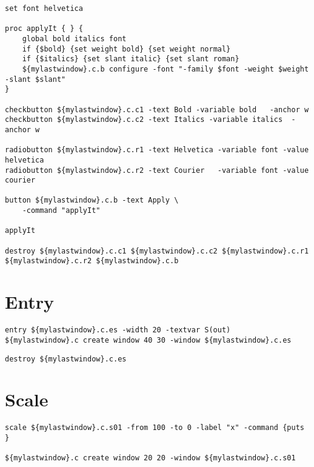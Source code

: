 \begin{lstlisting}
set font helvetica

proc applyIt { } {
    global bold italics font
    if {$bold} {set weight bold} {set weight normal}
    if {$italics} {set slant italic} {set slant roman}
    ${mylastwindow}.c.b configure -font "-family $font -weight $weight -slant $slant"
}

checkbutton ${mylastwindow}.c.c1 -text Bold -variable bold   -anchor w
checkbutton ${mylastwindow}.c.c2 -text Italics -variable italics  -anchor w

radiobutton ${mylastwindow}.c.r1 -text Helvetica -variable font -value helvetica
radiobutton ${mylastwindow}.c.r2 -text Courier   -variable font -value courier   

button ${mylastwindow}.c.b -text Apply \
    -command "applyIt"

applyIt

destroy ${mylastwindow}.c.c1 ${mylastwindow}.c.c2 ${mylastwindow}.c.r1 ${mylastwindow}.c.r2 ${mylastwindow}.c.b
\end{lstlisting}

\section{Entry}

\begin{lstlisting}
entry ${mylastwindow}.c.es -width 20 -textvar S(out)
${mylastwindow}.c create window 40 30 -window ${mylastwindow}.c.es
\end{lstlisting}


\begin{lstlisting}
destroy ${mylastwindow}.c.es
\end{lstlisting}

\section{Scale}

\begin{lstlisting}
scale ${mylastwindow}.c.s01 -from 100 -to 0 -label "x" -command {puts }

${mylastwindow}.c create window 20 20 -window ${mylastwindow}.c.s01
\end{lstlisting}

